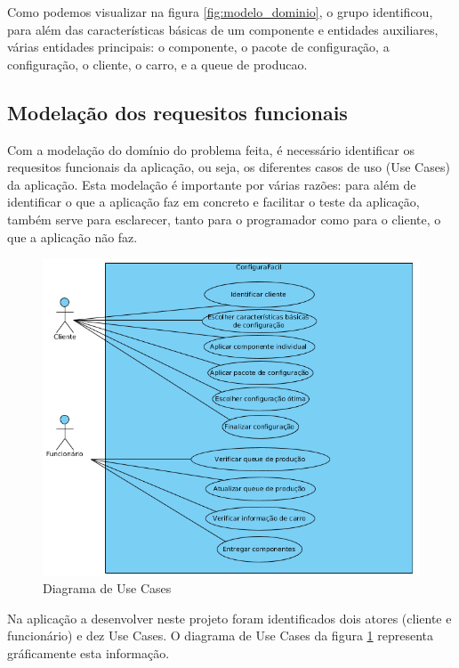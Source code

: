 \documentclass{llncs}
\newcommand\tab[1][0.5cm]{\hspace*{#1}}
\begin{document}
\tab Como podemos visualizar na figura \ref{fig:modelo_dominio}, o grupo identificou, para além das características básicas de um componente e entidades auxiliares, várias entidades principais: o componente, o pacote de configuração, a configuração, o cliente, o carro, e a queue de producao. 

\subsection{Modelação dos requesitos funcionais}

Com a modelação do domínio do problema feita, é necessário identificar os requesitos funcionais da aplicação, ou seja, os diferentes casos de uso (Use Cases) da aplicação. Esta modelação é importante por várias razões: para além de identificar o que a aplicação faz em concreto e facilitar o teste da aplicação, também serve para esclarecer, tanto para o programador como para o cliente, o que a aplicação não faz.

\begin{figure}
\begin{center}
\includegraphics[scale=0.40]{diagrama_use_cases.png} 
\end{center}
\caption{\label{fig:diagrama_use_cases}Diagrama de Use Cases}
\end{figure} 

\tab Na aplicação a desenvolver neste projeto foram identificados dois atores (cliente e funcionário) e dez Use Cases. O diagrama de Use Cases da figura \ref{fig:diagrama_use_cases} representa gráficamente esta informação.
\end{document}
